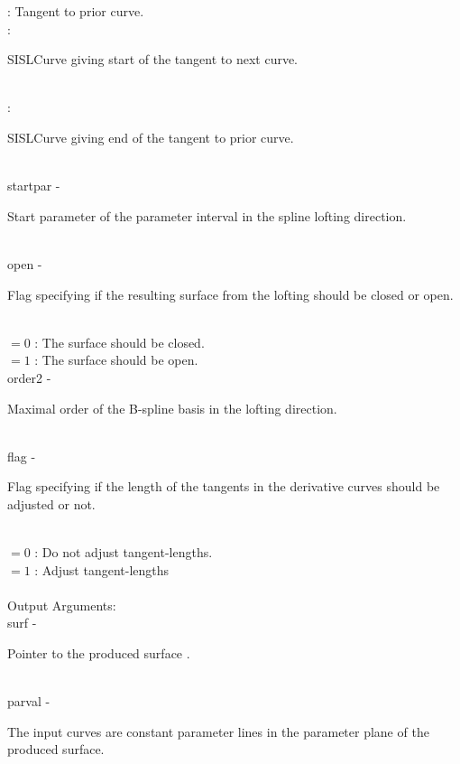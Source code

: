 		\>\>\>\> : \>	Tangent to prior curve.\\
		\>\>\>\> : \>	\begin{minipg5}
					SISLCurve giving start of the tangent to next curve.
					\end{minipg5}\\[0.8ex]
		\>\>\>\> : \>	\begin{minipg5}
					SISLCurve giving end of the tangent to prior curve.
					\end{minipg5}\\[0.8ex]
	\>\>	{\fov startpar}\> - \>	\begin{minipg2}
				Start parameter of the parameter interval in the spline lofting direction.	
				\end{minipg2} \\[0.3ex]
	\>\>	{\fov open}\> - \>	\begin{minipg2}
				Flag specifying if the resulting surface from the lofting should be closed 
						or open.
				\end{minipg2} \\[0.8ex]
		\>\>\>\>\>	$=0$ : \>	The surface should be closed.\\
		\>\>\>\>\>	$=1$ : \>	The surface should be open.\\
{\fov 	}\>\>	order2	\> - \> \begin{minipg2}
				Maximal order of the B-spline basis in the lofting 	
				direction.
				\end{minipg2}\\[0.8ex]
	\>\>	{\fov flag}\> - \>	\begin{minipg2}
				Flag specifying if the length of the
				tangents in the derivative curves 
				should be adjusted or not.
				\end{minipg2}\\[0.3ex]
		\>\>\>\>\>	$=0$ : \>	Do not adjust tangent-lengths.\\
		\>\>\>\>\>	$=1$ : \>	Adjust tangent-lengths\\
\\
	\>Output Arguments:\\
	\>\>	{\fov surf}\> - \>	\begin{minipg2}
				Pointer to the produced surface .
				\end{minipg2}\\
	\>\>	{\fov parval}\> - \>	\begin{minipg2}
			The input curves are constant parameter lines in the parameter
			plane of the produced surface.
				\end{minipg2}\\[0.3ex]
